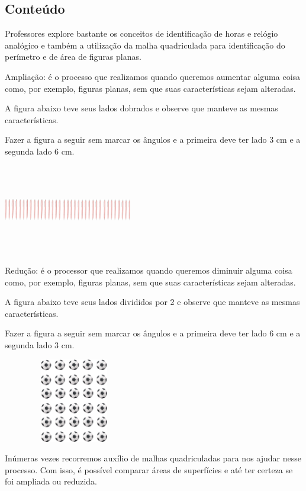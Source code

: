 \subsection{Conteúdo}\label{conteuxfado-4}

Professores explore bastante os conceitos de identificação de horas e
relógio analógico e também a utilização da malha quadriculada para
identificação do perímetro e de área de figuras planas.

Ampliação: é o processo que realizamos quando queremos aumentar alguma
coisa como, por exemplo, figuras planas, sem que suas características
sejam alteradas.

A figura abaixo teve seus lados dobrados e observe que manteve as mesmas
características.

Fazer a figura a seguir sem marcar os ângulos e a primeira deve ter lado
3 cm e a segunda lado 6 cm.

\includegraphics[width=2.21154in,height=1.55185in]{media/image56.png}

Redução: é o processor que realizamos quando queremos diminuir alguma
coisa como, por exemplo, figuras planas, sem que suas características
sejam alteradas.

A figura abaixo teve seus lados divididos por 2 e observe que manteve as
mesmas características.

Fazer a figura a seguir sem marcar os ângulos e a primeira deve ter lado
6 cm e a segunda lado 3 cm.

\includegraphics[width=2.44231in,height=1.44820in]{media/image57.png}

Inúmeras vezes recorremos auxílio de malhas quadriculadas para nos
ajudar nesse processo. Com isso, é possível comparar áreas de
superfícies e até ter certeza se foi ampliada ou reduzida.

